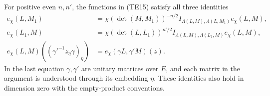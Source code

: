 \begin{theorem}\label{te-equivariance}
For positive even $n,n'$, the functions in (TE15)
satisfy all three identities
\[
 \begin{split}
 e_\chi(L,M_1)&=\chi(\det(M,M_1))^{-n/2}
                         I_{\Lambda(L,M),\Lambda(L,M_1)}e_\chi(L,M),\\
 e_\chi(L_1,M)&=\chi(\det(L,L_1))^{n'/2}
                         I_{\Lambda(L,M),\Lambda(L_1,M)}e_\chi(L,M),\\
 e_\chi(L,M)((\gamma'^{-1}z_\eta\gamma)_\eta)
                         &=e_\chi(\gamma L,\gamma'M)(z).
 \end{split}
 \tag{TE17}
\]
In the last equation $\gamma,\gamma'$ are unitary
matrices over $E$, and each matrix in the argument is
understood through its embedding $\eta$.
These identities also hold in dimension zero with the
empty-product conventions.
\end{theorem}
